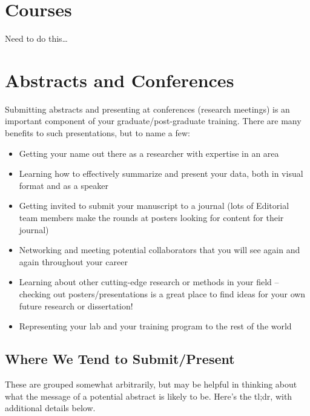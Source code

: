 \documentclass[
  letterpaper,
  DIV=11,
  numbers=noendperiod]{scrreprt}
\begin{document}

\hypertarget{sec-courses}{%
\chapter{Courses}\label{sec-courses}}

Need to do this\ldots{}


\hypertarget{sec-conferences}{%
\chapter{Abstracts and Conferences}\label{sec-conferences}}

Submitting abstracts and presenting at conferences (research meetings)
is an important component of your graduate/post-graduate training. There
are many benefits to such presentations, but to name a few:

\begin{itemize}
\item
  Getting your name out there as a researcher with expertise in an area
\item
  Learning how to effectively summarize and present your data, both in
  visual format and as a speaker
\item
  Getting invited to submit your manuscript to a journal (lots of
  Editorial team members make the rounds at posters looking for content
  for their journal)
\item
  Networking and meeting potential collaborators that you will see again
  and again throughout your career
\item
  Learning about other cutting-edge research or methods in your field --
  checking out posters/presentations is a great place to find ideas for
  your own future research or dissertation!
\item
  Representing your lab and your training program to the rest of the
  world
\end{itemize}

\hypertarget{where-we-tend-to-submitpresent}{%
\section{Where We Tend to
Submit/Present}\label{where-we-tend-to-submitpresent}}

These are grouped somewhat arbitrarily, but may be helpful in thinking
about what the message of a potential abstract is likely to be. Here's
the tl;dr, with additional details below.
\end{document}
